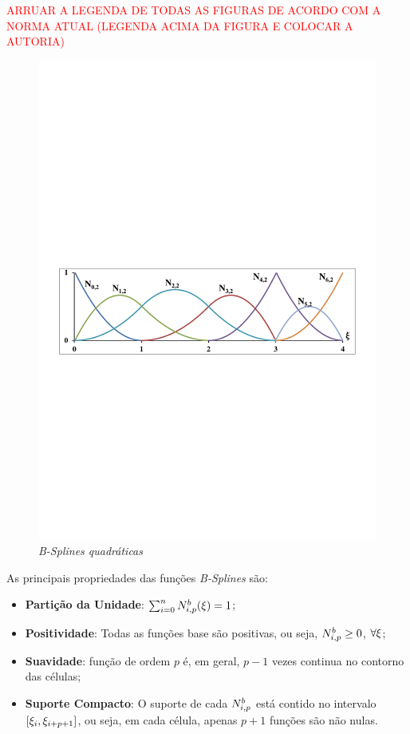\documentclass[tese_patricia]{subfiles}
\begin{document}
\textcolor{red}{ARRUAR A LEGENDA DE TODAS AS FIGURAS DE ACORDO COM A NORMA ATUAL (LEGENDA ACIMA DA FIGURA E COLOCAR A AUTORIA)}
\begin{figure}[htb!]
	\centering 
	\includegraphics[scale=0.7,trim=1.5cm 11.5cm 1.5cm 13cm, clip=true]{Imagens/Cap3/bspline_funcoes.pdf}	
	\caption{\textit{B-Splines quadráticas}}
	\label{fig:bspline_funcoes}
\end{figure}

As principais propriedades das funções \textit{B-Splines} são:

\begin{itemize}
	\item \textbf{Partição da Unidade}: $\sum_{i=0}^{n}N^b_{i,p}(\xi)=1 $;
	\item \textbf{Positividade}: Todas as funções base são positivas, ou seja, $N^b_{i,p}\geq0$, $\forall\xi$;
	\item \textbf{Suavidade}: função de ordem $p$ é, em geral, $p-1$ vezes continua no contorno das células;
	\item \textbf{Suporte Compacto}: O suporte de cada $N^b_{i,p}$ está contido no intervalo $\left[\xi_i,\xi_{i+p+1}\right]$, ou seja, em cada célula, apenas $p+1$ funções são não nulas. %
\end{itemize}
\end{document}
